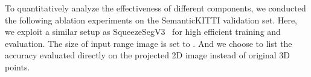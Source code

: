 \documentclass{article}
\begin{document}
\begin{table} [t] \tiny
\centering
	\caption{Impact of kenel size on time of model inference}
	\label{tab:speed}
	\vspace{-5mm}
\end{table}

\label{sec:abla}
To quantitatively analyze the effectiveness of different components, we conducted the following ablation experiments on the SemanticKITTI validation set. Here, we exploit a similar setup as SqueezeSegV3~\cite{xu2020squeezesegv3} for high efficient training and evaluation. The size of input range image is set to . And we choose to list the accuracy evaluated directly on the projected 2D image instead of original 3D points.
\end{document}

